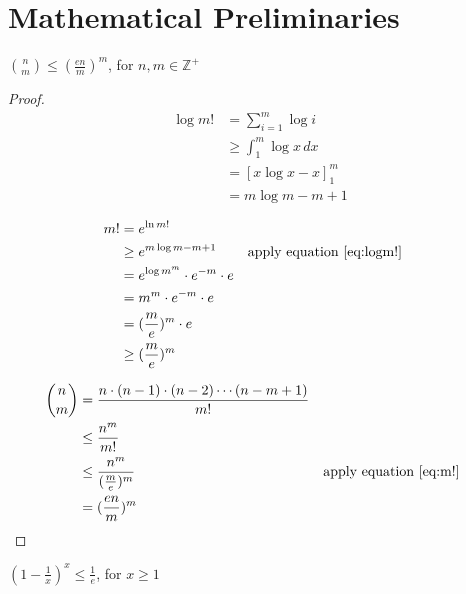 \chapter{Mathematical Preliminaries}

\begin{lemma}
\label{lemma:nchoosem}

$\binom{n}{m} \le (\frac{en}{m})^m$, for $n, m \in \mathbb{Z}^+$

\end{lemma}

\begin{proof}
\begin{align}
\log m! 
    &= \sum_{i=1}^{m} \log i \nonumber \\
    &\ge \int_1^m \log x \, dx \nonumber \\
    &= [x \log x - x]_1^m \nonumber \\
    &= m \log m - m + 1 \label{eq:logm!}
\end{align}

\begin{align}
m! 
    &= e^{\ln m!} \nonumber \\
    &\ge e^{m \log m - m + 1} \nonumber 
    && \text{apply equation \ref{eq:logm!}} \\
    &= e^{\log m^m} \cdot e^{-m} \cdot e \nonumber \\
    &= m^m \cdot e^{-m} \cdot e \nonumber \\
    &= (\frac{m}{e})^m \cdot e \nonumber \\
    &\ge (\frac{m}{e})^m \label{eq:m!}
\end{align}


\begin{align}
\binom{n}{m} 
    &= \frac{n \cdot (n-1) \cdot (n-2) \cdots (n-m+1)}{m!} \nonumber \\
    &\le \frac{n^m}{m!} \nonumber \\
    &\le \frac{n^m}{(\frac{m}{e})^m} \nonumber 
    && \text{apply equation \ref{eq:m!}} \\
    &= (\frac{en}{m})^m
\end{align}

\end{proof}

\begin{lemma}
\label{lemma:(1-1x)x}

$(1 - \frac{1}{x})^x \le \frac{1}{e}$, for $x \ge 1$

\end{lemma}

